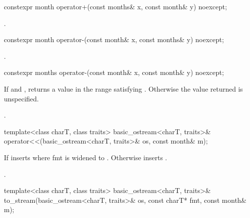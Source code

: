 %
\begin{itemdecl}
constexpr month operator+(const months& x, const month& y) noexcept;
\end{itemdecl}

\begin{itemdescr}
\pnum
\returns {}.
\end{itemdescr}

%
\begin{itemdecl}
constexpr month operator-(const month& x, const months& y) noexcept;
\end{itemdecl}

\begin{itemdescr}
\pnum
\returns {}.
\end{itemdescr}

%
\begin{itemdecl}
constexpr months operator-(const month& x, const month& y) noexcept;
\end{itemdecl}

\begin{itemdescr}
\pnum
\returns
If 
and ,
returns a value 
in the range 
satisfying .
Otherwise the value returned is unspecified.
\begin{example}
.
\end{example}
\end{itemdescr}

%
\begin{itemdecl}
template<class charT, class traits>
  basic_ostream<charT, traits>&
    operator<<(basic_ostream<charT, traits>& os, const month& m);
\end{itemdecl}

\begin{itemdescr}
\pnum
\effects
If 
inserts 
where fmt is  widened to .
Otherwise inserts .

\pnum
\returns {}.
\end{itemdescr}

%
\begin{itemdecl}
template<class charT, class traits>
  basic_ostream<charT, traits>&
    to_stream(basic_ostream<charT, traits>& os, const charT* fmt, const month& m);
\end{itemdecl}

